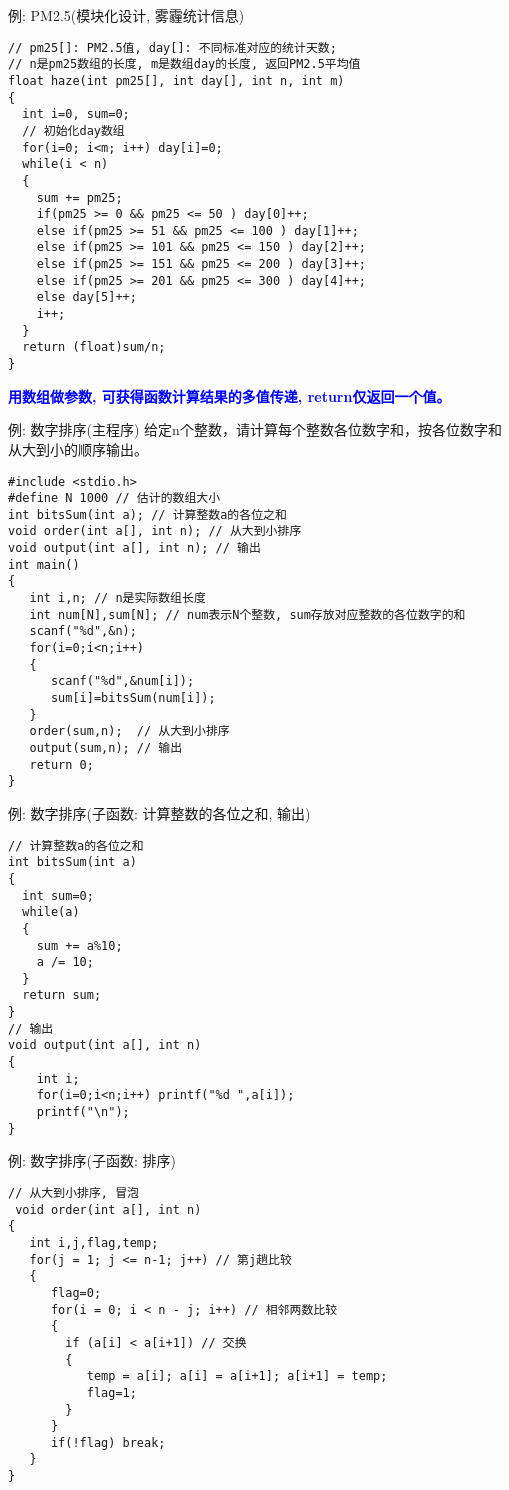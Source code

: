 \begin{frame}{例: PM2.5(模块化设计, 雾霾统计信息)}
\begin{lstlisting}
// pm25[]: PM2.5值, day[]: 不同标准对应的统计天数; 
// n是pm25数组的长度, m是数组day的长度, 返回PM2.5平均值
float haze(int pm25[], int day[], int n, int m)
{
  int i=0, sum=0;
  // 初始化day数组
  for(i=0; i<m; i++) day[i]=0;
  while(i < n) 
  {
    sum += pm25;
    if(pm25 >= 0 && pm25 <= 50 ) day[0]++;
    else if(pm25 >= 51 && pm25 <= 100 ) day[1]++;
    else if(pm25 >= 101 && pm25 <= 150 ) day[2]++;
    else if(pm25 >= 151 && pm25 <= 200 ) day[3]++;
    else if(pm25 >= 201 && pm25 <= 300 ) day[4]++;
    else day[5]++;
    i++;
  } 
  return (float)sum/n;
} 
\end{lstlisting}
\textbf{\textcolor{blue}{用数组做参数, 可获得函数计算结果的多值传递, return仅返回一个值。}}
\end{frame}

\begin{frame}{例: 数字排序(主程序)}
给定n个整数，请计算每个整数各位数字和，按各位数字和从大到小的顺序输出。
\begin{lstlisting}
#include <stdio.h>
#define N 1000 // 估计的数组大小
int bitsSum(int a); // 计算整数a的各位之和
void order(int a[], int n); // 从大到小排序
void output(int a[], int n); // 输出
int main()
{
   int i,n; // n是实际数组长度 
   int num[N],sum[N]; // num表示N个整数, sum存放对应整数的各位数字的和  
   scanf("%d",&n);
   for(i=0;i<n;i++) 
   {
      scanf("%d",&num[i]); 
      sum[i]=bitsSum(num[i]);
   }
   order(sum,n);  // 从大到小排序
   output(sum,n); // 输出
   return 0;
}
\end{lstlisting}
\end{frame}

\begin{frame}{例: 数字排序(子函数: 计算整数的各位之和, 输出)}
\begin{lstlisting}
// 计算整数a的各位之和
int bitsSum(int a)
{
  int sum=0;
  while(a)
  {
    sum += a%10;
    a /= 10;
  }
  return sum;
}
// 输出
void output(int a[], int n)
{
    int i;
    for(i=0;i<n;i++) printf("%d ",a[i]);
    printf("\n");
}
\end{lstlisting}
\end{frame}

\begin{frame}{例: 数字排序(子函数: 排序)}
\begin{lstlisting}
// 从大到小排序, 冒泡
 void order(int a[], int n)
{
   int i,j,flag,temp;
   for(j = 1; j <= n-1; j++) // 第j趟比较
   {
      flag=0;
      for(i = 0; i < n - j; i++) // 相邻两数比较
      {
        if (a[i] < a[i+1]) // 交换
        { 
           temp = a[i]; a[i] = a[i+1]; a[i+1] = temp; 
           flag=1;
        }
      }
      if(!flag) break;
   }
}
\end{lstlisting}
\end{frame}

